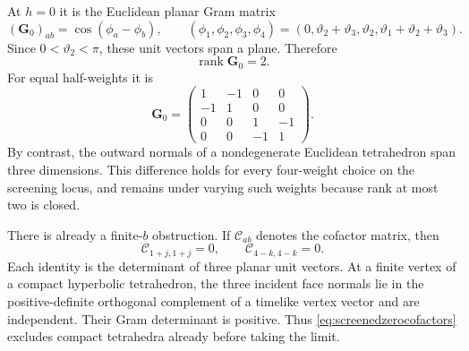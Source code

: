 \documentclass[11pt,a4paper]{article}
\numberwithin{equation}{section}
\theoremstyle{definition}
\theoremstyle{remark}
\begin{document}
At $h=0$ it is the Euclidean planar Gram matrix
\begin{equation}
 (\mathbf G_0)_{ab}=\cos(\phi_a-\phi_b),\qquad
 (\phi_1,\phi_2,\phi_3,\phi_4)=
 (0,\vartheta_2+\vartheta_3,\vartheta_2,
                       \vartheta_1+\vartheta_2+\vartheta_3).
 \label{eq:screenedplanarGram}
\end{equation}
Since $0<\vartheta_2<\pi$, these unit vectors span a plane.
Therefore
\begin{equation}
 \boxed{\qquad \operatorname{rank}\mathbf G_0=2.\qquad}
 \label{eq:screenedranktwo}
\end{equation}
For equal half-weights it is
\[
 \mathbf G_0=
 \begin{pmatrix}1&-1&0&0\\-1&1&0&0\\
                 0&0&1&-1\\0&0&-1&1\end{pmatrix}.
\]
By contrast, the outward normals of a nondegenerate Euclidean
tetrahedron span three dimensions. This difference holds for
every four-weight choice on the screening locus, and remains
under varying such weights because rank at most two is closed.

There is already a finite-$b$ obstruction. If $\mathcal C_{ab}$
denotes the cofactor matrix, then
\begin{equation}
 \mathcal C_{1+j,1+j}=0,\qquad
 \mathcal C_{4-k,4-k}=0.
 \label{eq:screenedzerocofactors}
\end{equation}
Each identity is the determinant of three planar unit vectors.
At a finite vertex of a compact hyperbolic tetrahedron, the
three incident face normals lie in the positive-definite
orthogonal complement of a timelike vertex vector and are
independent. Their Gram determinant is positive. Thus
\eqref{eq:screenedzerocofactors} excludes compact tetrahedra
already before taking the limit.
\end{document}
